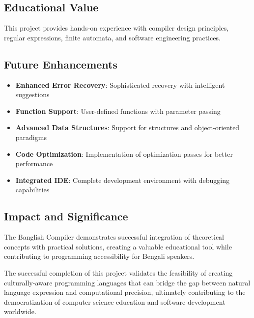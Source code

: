 \documentclass[12pt,a4paper]{article}
\begin{document}
\subsection{Educational Value}

This project provides hands-on experience with compiler design principles, regular expressions, finite automata, and software engineering practices.

\subsection{Future Enhancements}

\begin{itemize}[leftmargin=*,itemsep=3pt]
    \item \textbf{Enhanced Error Recovery}: Sophisticated recovery with intelligent suggestions
    \item \textbf{Function Support}: User-defined functions with parameter passing
    \item \textbf{Advanced Data Structures}: Support for structures and object-oriented paradigms
    \item \textbf{Code Optimization}: Implementation of optimization passes for better performance
    \item \textbf{Integrated IDE}: Complete development environment with debugging capabilities
\end{itemize}

\subsection{Impact and Significance}

The Banglish Compiler demonstrates successful integration of theoretical concepts with practical solutions, creating a valuable educational tool while contributing to programming accessibility for Bengali speakers.

\vspace{6pt}
\noindent The successful completion of this project validates the feasibility of creating culturally-aware programming languages that can bridge the gap between natural language expression and computational precision, ultimately contributing to the democratization of computer science education and software development worldwide.
\end{document}

